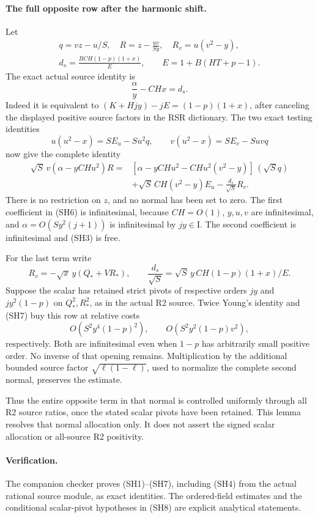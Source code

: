 \paragraph{The full opposite row after the harmonic shift.}
Let
\[
 \begin{gathered}
 q=vz-u/S,\quad R=z-\frac{uv}{Sy},\quad R_v=u(v^2-y),\\
 d_s=\frac{BCH(1-p)(1+x)}{E},\qquad E=1+B(HT+p-1).
 \end{gathered}
\]
The exact actual source identity is
\[
                 \frac{\alpha}{y}-CHx=d_s.             \tag{SH4}
\]
Indeed it is equivalent to
\((K+Hjy)-jE=(1-p)(1+x)\), after canceling the displayed
positive source factors in the RSR dictionary.
The two exact testing identities
\[
 u(u^2-x)=S E_u-Su^2q,\qquad
 v(u^2-x)=S E_v-Suvq                                  \tag{SH5}
\]
now give the complete identity
\[
\begin{split}
 \sqrt S\,v(\alpha-yCHu^2)R
 ={}&[\alpha-yCHu^2-CHu^2(v^2-y)]\,(\sqrt S q)\\
 &+\sqrt S\,CH(v^2-y)E_u-\frac{d_s}{\sqrt S}R_v .
\end{split}                                                     \tag{SH6}
\]
There is no restriction on \(z\), and no normal has been set to
zero.  The first coefficient in (SH6) is infinitesimal, because
\(CH=O(1)\), \(y,u,v\) are infinitesimal, and
\(\alpha=O(Sy^2(j+1))\) is infinitesimal by \(jy\in\mathrm I\).
The second coefficient is infinitesimal and (SH3) is free.

For the last term write
\[
 R_v=-\sqrt x\,y(Q_*+VR_*),\qquad
 \frac{d_s}{\sqrt S}
   =\sqrt S\,y\,CH(1-p)(1+x)/E.                         \tag{SH7}
\]
Suppose the scalar has retained strict pivots of respective orders
\(jy\) and \(jy^2(1-p)\) on \(Q_*^2,R_*^2\), as in the actual
R2 source.  Twice Young's identity and (SH7) buy this row at
relative costs
\[
 O(S^2y^4(1-p)^2),\qquad
 O(S^2y^2(1-p)v^2),                                   \tag{SH8}
\]
respectively.  Both are infinitesimal even when \(1-p\) has
arbitrarily small positive order.  No inverse of that opening
remains.  Multiplication by the additional bounded source
factor \(\sqrt{\ell(1-\ell)}\), used to normalize the complete
second normal, preserves the estimate.

Thus the entire opposite term in that normal is controlled
uniformly through all R2 source ratios, once the stated scalar
pivots have been retained.  This lemma resolves that normal
allocation only.  It does not assert the signed scalar allocation
or all-source R2 positivity.

\paragraph{Verification.}
The companion checker proves (SH1)--(SH7), including (SH4) from
the actual rational source module, as exact identities.  The
ordered-field estimates and the conditional scalar-pivot
hypotheses in (SH8) are explicit analytical statements.
